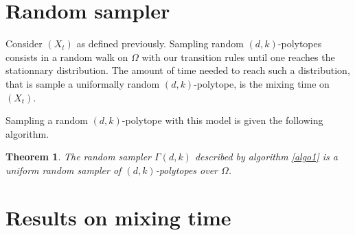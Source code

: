 \documentclass[a4paper]{article}
\newtheorem{theorem}{Theorem}
\begin{document}
\section{Random sampler}

Consider $(X_t)$ as defined previously. Sampling random $(d, k)$-polytopes consists in a random walk on $\Omega$ with our transition rules until one reaches the stationnary distribution. The amount of time needed to reach such a distribution, that is sample a uniformally random $(d, k)$-polytope, is the mixing time on $(X_t)$.

Sampling a random $(d, k)$-polytope with this model is given the following algorithm.

\vspace{0.5cm}



\begin{theorem}\label{thm:random-sampler}
  The random sampler $\Gamma(d,k)$ described by algorithm \ref{algo1} is a uniform random sampler of $(d,k)$-polytopes over $\Omega$.
\end{theorem}

\section{Results on mixing time}



\clearpage


\end{document}
